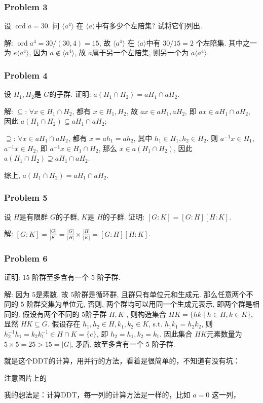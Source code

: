 \documentclass[a4paper,12pt]{ctexart}
\begin{document}
\subsubsection*{Problem 3}
  设 $ \operatorname{ord} a = 30 $. 问 $ \langle a^4\rangle $ 在  $ \langle a\rangle $中有多少个左陪集? 试将它们列出.

  解: $ \operatorname{ord}a^4=30/(30,4)=15 $, 故 $ \langle a^4\rangle $ 在  $ \langle a\rangle $中有 $ 30/15=2 $ 个左陪集. 
  其中之一为 $ e\langle a^4\rangle $, 因为 $ a\notin \langle a^4\rangle $, 故 $ a $属于另一个左陪集, 则另一个为 $ a\langle a^4\rangle $.

\subsubsection*{Problem 4}
  设 $ H_1,H_2 $是 $ G $的子群. 证明: $ a\left(H_1\cap H_2\right)=aH_1\cap aH_2 $.

  解: $ \subseteq $: $ \forall x\in H_1\cap H_2 $, 都有 $ x\in H_1,H_2 $, 故 $ ax\in aH_1,aH_2 $, 即 $ ax\in aH_1\cap aH_2 $, 
  因此 $ a\left(H_1\cap H_2\right)\subseteq aH_1\cap aH_2 $;

  $ \supseteq $: $ \forall x\in aH_1\cap aH_2 $, 都有 $ x=ah_1=ah_2 $, 其中 $ h_1\in H_1,h_2\in H_2 $. 则 $ a^{-1}x\in H_1 $, 
  $ a^{-1}x\in H_2 $, 即 $ a^{-1}x\in H_1\cap H_2 $, 那么 $ x\in a\left( H_1\cap H_2\right) $, 因此 $ a\left(H_1\cap H_2\right) \supseteq aH_1\cap aH_2 $.

  综上, $ a\left(H_1\cap H_2\right)=aH_1\cap aH_2 $.

\subsubsection*{Problem 5}
  设 $ H $是有限群 $ G $的子群, $ K $是 $ H $的子群. 证明: $ \left[G:K\right]=\left[G:H\right]\left[H:K\right] $.

  解: $ \left[G:K\right]= \frac{|G|}{|K|}=\frac{|G|}{|H|}\times\frac{|H|}{|K|}=\left[G:H\right]\left[H:K\right] $.

\subsubsection*{Problem 6}
  证明: $ 15 $ 阶群至多含有一个 $ 5 $ 阶子群.

  解: 因为 $ 5 $是素数, 故 $ 5 $阶群是循环群, 且群只有单位元和生成元. 
  那么任意两个不同的 $ 5 $ 阶群交集为单位元, 否则, 两个群均可以用同一个生成元表示, 即两个群是相同的. 
  假设有两个不同的 $ 5 $阶子群 $ H,K $ , 则构造集合 $ HK=\{hk\mid h\in H,k\in K\} $, 显然 $ HK\subseteq G $. 
  假设存在 $ h_1,h_2\in H,k_1,k_2\in K $, 
  s.t. $ h_1k_1=h_2k_2 $, 则 $ h_2^{-1}h_1=k_2k_1^{-1}\in H\cap K=\{e\} $, 即 $ h_2=h_1,k_2=k_1 $. 因此集合  $ HK $元素数量为 $ 5\times 5=25>15=|G| $, 矛盾, 故至多含有一个 $ 5 $ 阶子群.







  就是这个DDT的计算，用并行的方法，看着是很简单的，不知道有没有坑：

  注意图片上的

  我的想法是：计算DDT，每一列的计算方法是一样的，比如 $ a=0 $ 这一列，
\end{document}
